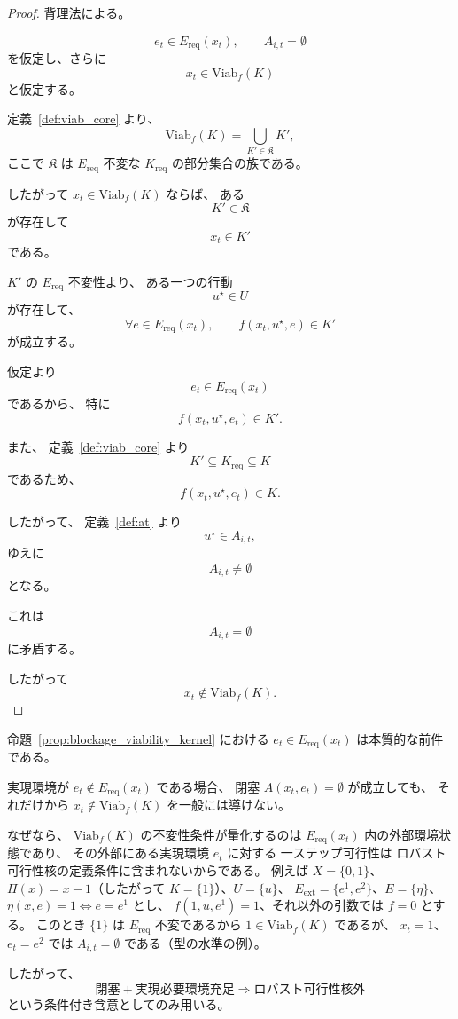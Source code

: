 \begin{proof}
背理法による。

\[
  e_t\in E_{\mathrm{req}}(x_t),
  \qquad
  A_{i,t}=\emptyset
\]
を仮定し、さらに
\[
  x_t\in\mathrm{Viab}_f(K)
\]
と仮定する。

定義~\ref{def:viab_core} より、
\[
  \mathrm{Viab}_f(K)
  =
  \bigcup_{K'\in\mathfrak{K}} K',
\]
ここで $\mathfrak{K}$ は
$E_{\mathrm{req}}$ 不変な
$K_{\mathrm{req}}$ の部分集合の族である。

したがって
$x_t\in\mathrm{Viab}_f(K)$ ならば、
ある
\[
  K'\in\mathfrak{K}
\]
が存在して
\[
  x_t\in K'
\]
である。

$K'$ の $E_{\mathrm{req}}$ 不変性より、
ある一つの行動
\[
  u^\star\in U
\]
が存在して、
\[
  \forall e\in E_{\mathrm{req}}(x_t),\qquad
  f(x_t,u^\star,e)\in K'
\]
が成立する。

仮定より
\[
  e_t\in E_{\mathrm{req}}(x_t)
\]
であるから、
特に
\[
  f(x_t,u^\star,e_t)\in K'.
\]

また、
定義~\ref{def:viab_core} より
\[
  K'
  \subseteq
  K_{\mathrm{req}}
  \subseteq
  K
\]
であるため、
\[
  f(x_t,u^\star,e_t)\in K.
\]

したがって、
定義~\ref{def:at} より
\[
  u^\star\in A_{i,t},
\]
ゆえに
\[
  A_{i,t}\neq\emptyset
\]
となる。

これは
\[
  A_{i,t}=\emptyset
\]
に矛盾する。

したがって
\[
  x_t\notin\mathrm{Viab}_f(K).
\]
\end{proof}

\begin{remark}
\label{rem:blockage_viab_requires_ereq}
命題~\ref{prop:blockage_viability_kernel} における
$e_t\in E_{\mathrm{req}}(x_t)$
は本質的な前件である。

実現環境が
$e_t\notin E_{\mathrm{req}}(x_t)$
である場合、
閉塞
$A(x_t,e_t)=\emptyset$
が成立しても、
それだけから
$x_t\notin\mathrm{Viab}_f(K)$
を一般には導けない。

なぜなら、
$\mathrm{Viab}_f(K)$ の不変性条件が量化するのは
$E_{\mathrm{req}}(x_t)$ 内の外部環境状態であり、
その外部にある実現環境 $e_t$ に対する
一ステップ可行性は
ロバスト可行性核の定義条件に含まれないからである。
例えば $X=\{0,1\}$、$\Pi(x)=x-1$（したがって $K=\{1\}$）、$U=\{u\}$、
$E_{\mathrm{ext}}=\{e^1,e^2\}$、$E=\{\eta\}$、$\eta(x,e)=1\iff e=e^1$ とし、
$f(1,u,e^1)=1$、それ以外の引数では $f=0$ とする。
このとき $\{1\}$ は $E_{\mathrm{req}}$ 不変であるから $1\in\mathrm{Viab}_f(K)$ であるが、
$x_t=1$、$e_t=e^2$ では $A_{i,t}=\emptyset$ である（型の水準の例）。

したがって、
\[
  \text{閉塞}
  +
  \text{実現必要環境充足}
  \Longrightarrow
  \text{ロバスト可行性核外}
\]
という条件付き含意としてのみ用いる。
\end{remark}


